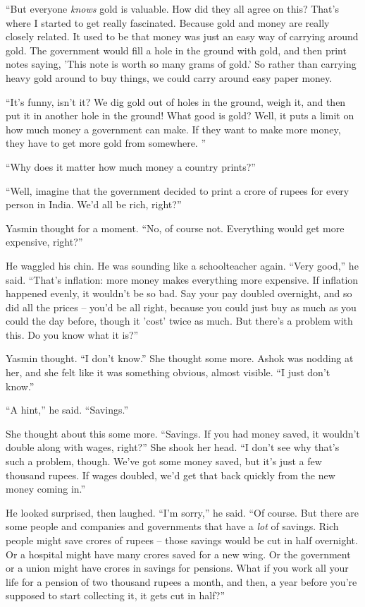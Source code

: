 ``But everyone \emph{knows} gold is valuable. How did they all agree
on this? That's where I started to get really fascinated. Because
gold and money are really closely related. It used to be that money
was just an easy way of carrying around gold. The government would
fill a hole in the ground with gold, and then print notes saying,
'This note is worth so many grams of gold.' So rather than carrying
heavy gold around to buy things, we could carry around easy paper
money.

``It's funny, isn't it? We dig gold out of holes in the ground,
weigh it, and then put it in another hole in the ground! What good
is gold? Well, it puts a limit on how much money a government can
make. If they want to make more money, they have to get more gold
from somewhere. ''

``Why does it matter how much money a country prints?''

``Well, imagine that the government decided to print a crore of
rupees for every person in India. We'd all be rich, right?''

Yasmin thought for a moment. ``No, of course not. Everything would
get more expensive, right?''

He waggled his chin. He was sounding like a schoolteacher again.
``Very good,'' he said. ``That's inflation: more money makes
everything more expensive. If inflation happened evenly, it
wouldn't be so bad. Say your pay doubled overnight, and so did all
the prices -- you'd be all right, because you could just buy as
much as you could the day before, though it 'cost' twice as much.
But there's a problem with this. Do you know what it is?''

Yasmin thought. ``I don't know.'' She thought some more. Ashok was
nodding at her, and she felt like it was something obvious, almost
visible. ``I just don't know.''

``A hint,'' he said. ``Savings.''

She thought about this some more. ``Savings. If you had money saved,
it wouldn't double along with wages, right?'' She shook her head. ``I
don't see why that's such a problem, though. We've got some money
saved, but it's just a few thousand rupees. If wages doubled, we'd
get that back quickly from the new money coming in.''

He looked surprised, then laughed. ``I'm sorry,'' he said. ``Of
course. But there are some people and companies and governments
that have a \emph{lot} of savings. Rich people might save crores of
rupees -- those savings would be cut in half overnight. Or a
hospital might have many crores saved for a new wing. Or the
government or a union might have crores in savings for pensions.
What if you work all your life for a pension of two thousand rupees
a month, and then, a year before you're supposed to start
collecting it, it gets cut in half?''


